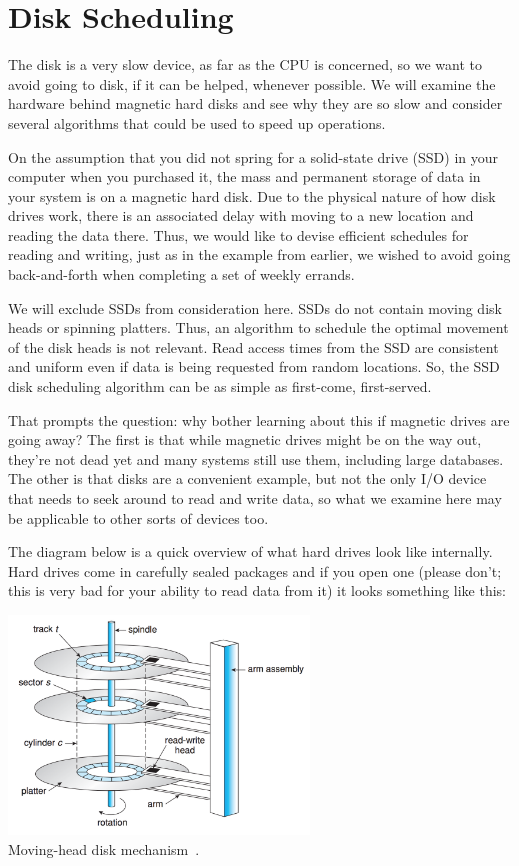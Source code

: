 




\section*{Disk Scheduling}
The disk is a very slow device, as far as the CPU is concerned, so we want to avoid going to disk, if it can be helped, whenever possible. We will examine the hardware behind magnetic hard disks and see why they are so slow and consider several algorithms that could be used to speed up operations.

On the assumption that you did not spring for a solid-state drive (SSD) in your computer when you purchased it, the mass and permanent storage of data in your system is on a magnetic hard disk. Due to the physical nature of how disk drives work, there is an associated delay with moving to a new location and reading the data there. Thus, we would like to devise efficient schedules for reading and writing, just as in the example from earlier, we wished to avoid going back-and-forth when completing a set of weekly errands.

We will exclude SSDs from consideration here. SSDs do not contain moving disk heads or spinning platters. Thus, an algorithm to schedule the optimal movement of the disk heads is not relevant. Read access times from the SSD are consistent and uniform even if data is being requested from random locations. So, the SSD disk scheduling algorithm can be as simple as first-come, first-served.

That prompts the question: why bother learning about this if magnetic drives are going away? The first is that while magnetic drives might be on the way out, they're not dead yet and many systems still use them, including large databases. The other is that disks are a convenient example, but not the only I/O device that needs to seek around to read and write data, so what we examine here may be applicable to other sorts of devices too.

The diagram below is a quick overview of what hard drives look like internally. Hard drives come in carefully sealed packages and if you open one (please don't; this is very bad for your ability to read data from it) it looks something like this:

\begin{center}
	\includegraphics[width=0.6\textwidth]{images/disk-hardware.png}\\
	Moving-head disk mechanism~\cite{osc}.
\end{center}

